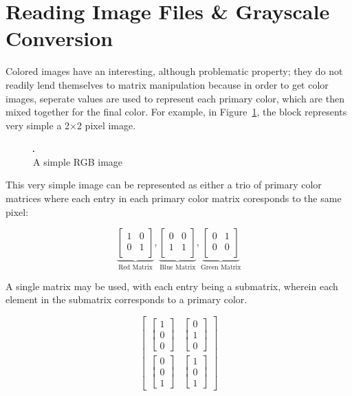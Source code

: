 \section{Reading Image Files \& Grayscale Conversion}

Colored images have an interesting, although problematic property; they do
not readily lend themselves to matrix             manipulation because in
order to get color images, seperate values are used to represent each primary
color, which are       then mixed together for the final color.  For example,
in Figure~\ref{fig:example}, the block represents very simple a
2$\times$2 pixel image.

\begin{figure}[ht]
  \centering
  \includegraphics[scale=40]{./img/sqr.png}
  \caption{A simple RGB image}
  \label{fig:example}
\end{figure}

This very simple
image can be
represented as either
a trio of primary
color matrices where
each entry in each
primary        color
matrix coresponds to
the same pixel:

\[  
  \underbrace{
    \begin{bmatrix}
      1&0\\
      0&1\\
    \end{bmatrix}
  }_{\text{Red
  Matrix}}
  ,
  \underbrace{
    \begin{bmatrix}
      0&0\\
      1&1\\
    \end{bmatrix}
  }_{\text{Blue
  Matrix}}
  ,
  \underbrace{
    \begin{bmatrix}
      0&1\\
      0&0\\
    \end{bmatrix}
  }_{\text{Green
  Matrix}}
\]

A
single
matrix
may
be
used,
with
each
entry
being
a
submatrix,
wherein
each
element
in
the
submatrix
corresponds
to
a
primary
color.

\[  
  \begin{bmatrix}
    \begin{bmatrix}1\\0\\0\end{bmatrix}
    &
    \begin{bmatrix}0\\1\\0\end{bmatrix}\\[2em]
    \begin{bmatrix}0\\0\\1\end{bmatrix}
    &
    \begin{bmatrix}1\\0\\1\end{bmatrix}
  \end{bmatrix}
\]

